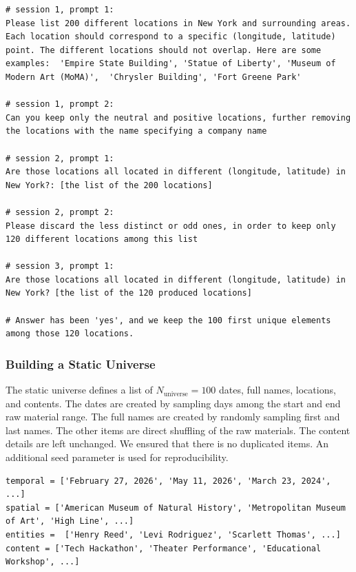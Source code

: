 \documentclass{article}
\begin{document}
\begin{lstlisting}[style=mystyle, caption={Process for building the raw locations}, label={lst:raw_locations}]
# session 1, prompt 1:
Please list 200 different locations in New York and surrounding areas. Each location should correspond to a specific (longitude, latitude) point. The different locations should not overlap. Here are some examples:  'Empire State Building', 'Statue of Liberty', 'Museum of Modern Art (MoMA)',  'Chrysler Building', 'Fort Greene Park'

# session 1, prompt 2:
Can you keep only the neutral and positive locations, further removing the locations with the name specifying a company name

# session 2, prompt 1:
Are those locations all located in different (longitude, latitude) in New York?: [the list of the 200 locations]

# session 2, prompt 2:
Please discard the less distinct or odd ones, in order to keep only 120 different locations among this list

# session 3, prompt 1:
Are those locations all located in different (longitude, latitude) in New York? [the list of the 120 produced locations]

# Answer has been 'yes', and we keep the 100 first unique elements among those 120 locations.
\end{lstlisting}

\subsubsection{Building a Static Universe}\label{app:1book:static_universe}

The static universe defines a list of $N_{\text{universe}} = 100$ dates, full names, locations, and contents. The dates are created by sampling days among the start and end raw material range. The full names are created by randomly sampling first and last names. The other items are direct shuffling of the raw materials. The content details are left unchanged. We ensured that there is no duplicated items. An additional seed parameter is used for reproducibility.

\begin{lstlisting}[style=mystyle, caption={Excerpt of the universe. Each list has $N_{\text{universe}} = 100$ elements.}, label={lst:universe}]
temporal = ['February 27, 2026', 'May 11, 2026', 'March 23, 2024', ...]
spatial = ['American Museum of Natural History', 'Metropolitan Museum of Art', 'High Line', ...]
entities =  ['Henry Reed', 'Levi Rodriguez', 'Scarlett Thomas', ...]
content = ['Tech Hackathon', 'Theater Performance', 'Educational Workshop', ...]
\end{lstlisting}
\end{document}
